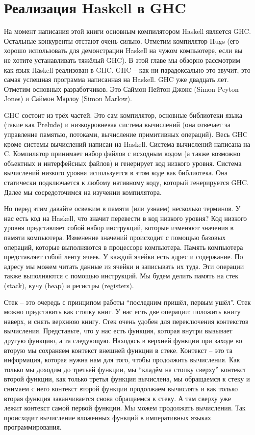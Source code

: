 \chapter{Реализация Haskell в GHC}

На момент написания этой книги основным компилятором Haskell является
GHC. Остальные конкуренты отстают очень сильно. Отметим компилятор Hugs
(его хорошо использовать для демонстрации Haskell на чужом компьютере,
если вы не хотите устанавливать тяжёлый GHC). В этой главе мы обзорно
рассмотрим как язык Hаskell реализован в GHC. GHC -- как ни
парадоксально это звучит, это самая успешная программа написанная на
Haskell. GHC уже двадцать лет. Отметим основных разработчиков. Это
Саймон Пейтон Джонс (Simon Peyton Jones) и Саймон Марлоу (Simon Marlow).

GHC состоит из трёх частей. Это сам компилятор, основные библиотеки
языка (такие как Prelude) и низкоуровневая система вычислений (она
отвечает за управление памятью, потоками, вычисление примитивных
операций). Весь GHC кроме системы вычислений написан на Haskell. Система
вычислений написана на C. Компилятор принимает набор файлов с исходным
кодом (а также возможно объектных и интерфейсных файлов) и генерирует
код низкого уровня. Система вычислений низкого уровня используется в
этом коде как библиотека. Она статически подключается к любому нативному
коду, который генерируется GHC. Далее мы сосредоточимся на изучении
компилятора.

Но перед этим давайте освежим в памяти (или узнаем) несколько терминов.
У нас есть код на Haskell, что значит перевести в код низкого уровня?
Код низкого уровня представляет собой набор инструкций, которые изменяют
значения в памяти компьютера. Изменение значений происходит с помощью
базовых операций, которые выполняются в процессоре компьютера. Память
компьютера представляет собой ленту ячеек. У каждой ячейки есть адрес и
содержание. По адресу мы можем читать данные из ячейки и записывать их
туда. Эти операции также выполняются с помощью инструкций. Мы будем
делить память на стек (stack), кучу (heap) и регистры (registers).

Стек -- это очередь с принципом работы ``последним пришёл, первым
ушёл''. Стек можно представить как стопку книг. У нас есть две операции:
положить книгу наверх, и снять верхнюю книгу. Стек очень удобен для
переключения контекстов вычисления. Представьте, что у нас есть функция,
которая внутри вызывает другую функцию, а та следующую. Находясь в
верхней функции при заходе во вторую мы сохраняем контекст внешней
функции в стеке. Контекст -- это та информация, которая нужна нам для
того, чтобы продолжить вычисления. Как только мы доходим до третьей
функции, мы ``кладём на стопку сверху'' контекст второй функции, как
только третья функция вычислена, мы обращаемся к стеку и снимаем с него
контекст второй функции продолжаем вычислять и как только вторая функция
заканчивается снова обращаемся к стеку. А там сверху уже лежит контекст
самой первой функции. Мы можем продолжать вычисления. Так происходит
вычисление вложенных функций в императивных языках программирования.

